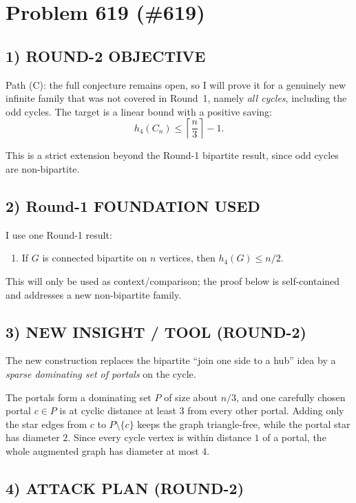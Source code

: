 
\section{Problem 619 (\#619)}

\subsection*{1) ROUND-2 OBJECTIVE}

Path (C): the full conjecture remains open, so I will prove it for a genuinely new infinite family that was not covered in Round~1, namely \emph{all cycles}, including the odd cycles. The target is a linear bound with a positive saving:
\[
h_4(C_n)\le \left\lceil \frac n3\right\rceil -1.
\]

This is a strict extension beyond the Round-1 bipartite result, since odd cycles are non-bipartite.

\subsection*{2) Round-1 FOUNDATION USED}

I use one Round-1 result:

\begin{enumerate}
\item If $G$ is connected bipartite on $n$ vertices, then $h_4(G)\le n/2$.
\end{enumerate}

This will only be used as context/comparison; the proof below is self-contained and addresses a new non-bipartite family.

\subsection*{3) NEW INSIGHT / TOOL (ROUND-2)}

The new construction replaces the bipartite ``join one side to a hub'' idea by a \emph{sparse dominating set of portals} on the cycle.

The portals form a dominating set $P$ of size about $n/3$, and one carefully chosen portal $c\in P$ is at cyclic distance at least $3$ from every other portal. Adding only the star edges from $c$ to $P\setminus\{c\}$ keeps the graph triangle-free, while the portal star has diameter $2$. Since every cycle vertex is within distance $1$ of a portal, the whole augmented graph has diameter at most $4$.

\subsection*{4) ATTACK PLAN (ROUND-2)}

